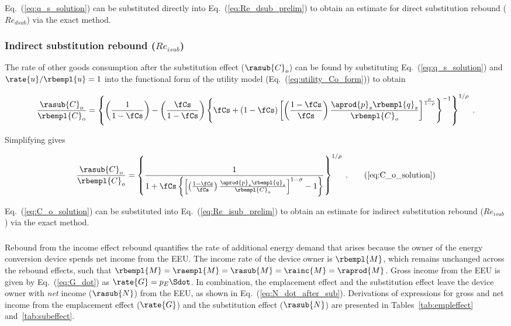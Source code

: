 Eq.~(\ref{eq:q_s_solution}) can be substituted directly
into Eq.~(\ref{eq:Re_dsub_prelim})
to obtain an estimate for direct substitution rebound ($Re_{dsub}$)
via the exact method.


\subsubsection{Indirect substitution rebound ($Re_{isub}$)} 
\label{sec:Reisub_exact}

The rate of other goods consumption after the substitution effect ($\rasub{C}_o$) 
can be found by substituting Eq.~(\ref{eq:q_s_solution}) and 
$\rate{u}/\rbempl{u} = 1$ 
into the functional form of the utility model (Eq.~(\ref{eq:utility_Co_form}))
to obtain

\begin{equation}
  \frac{\rasub{C}_o}{\rbempl{C}_o} = \left\{ \left( \frac{1}{1-\fCs} \right) 
                                     - \left( \frac{\fCs}{1-\fCs} \right)   
              \left\{ \fCs + (1-\fCs)
                  \left[ \left( \frac{1-\fCs}{\fCs} \right) \frac{\aprod{p}_s \rbempl{q}_s}{\rbempl{C}_o}   \right] 
                      ^{\frac{\rho}{1-\rho}} \right\} ^{-1} \right\} ^{1/\rho} \; .
\end{equation}

Simplifying gives

\begin{equation}
  \frac{\rasub{C}_o}{\rbempl{C}_o} = \left\{ \frac{1}{1 + \fCs \left\{ \left[ \left( \frac{1-\fCs}{\fCs} \right)
          \frac{\aprod{p}_s \rbempl{q}_s}{\rbempl{C}_o} \right] ^{1-\sigma} - 1 \right\}} \right\} 
                                                ^{1/\rho} \; .
                                            \tag{\ref{eq:C_o_solution}}
\end{equation}

Eq.~(\ref{eq:C_o_solution}) can be substituted into Eq.~(\ref{eq:Re_isub_prelim})
to obtain an estimate for indirect substitution rebound ($Re_{isub}$)
via the exact method.


\subsubsection{\Inceffect{}} 
\label{sec:Re_inc}

Rebound from the income effect rebound quantifies the rate of additional energy demand 
that arises because the owner of the energy conversion device spends net
income from the EEU.
The income rate of the device owner is $\rbempl{M}$, 
which remains unchanged across the rebound effects, 
such that
$\rbempl{M} = \raempl{M} = \rasub{M} = \rainc{M} = \raprod{M}$.
Gross income from the EEU is given by Eq.~(\ref{eq:G_dot})
as $\rate{G} = p_E \Sdot$. 
In combination, the emplacement effect and
the substitution effect leave the device owner with
\emph{net} income ($\rasub{N}$) from the EEU,
as shown in Eq.~(\ref{eq:N_dot_after_sub}).
Derivations of expressions for gross and net income from the 
emplacement effect ($\rate{G}$) and
the substitution effect ($\rasub{N}$)
are presented in Tables~\ref{tab:empleffect} and~\ref{tab:subeffect}.

